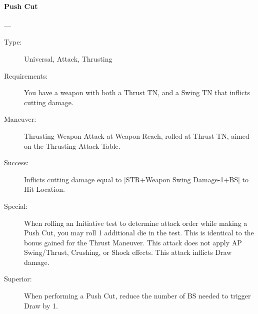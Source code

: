 \documentclass[oneside,11pt,english]{book}
\begin{document}
\paragraph{\large\label{man:Push Cut}Push Cut}---\quad{\large[X+1]}
\vspace{-10pt}\begin{description} 
\item [Type:] Universal, Attack, Thrusting 
\item [Requirements:] You have a weapon with both a Thrust TN, and a Swing TN that inflicts cutting damage. 
\item [Maneuver:] Thrusting Weapon Attack at Weapon Reach, rolled at Thrust TN, aimed on the Thrusting 
  Attack Table.
\item [Success:] Inflicts cutting damage equal to [STR+Weapon Swing Damage-1+BS] to Hit Location. 
\item [Special:] When rolling an Initiative test to determine attack order while making a Push Cut, you may roll 1 
  additional die in the test. This is identical to the bonus gained for the Thrust Maneuver. 
  This attack does not apply AP Swing/Thrust, Crushing, or Shock effects. 
  This attack inflicts Draw damage. 
\item [Superior:] When performing a Push Cut, reduce the number of BS needed to trigger Draw by 1.
\end{description}
\end{document}
